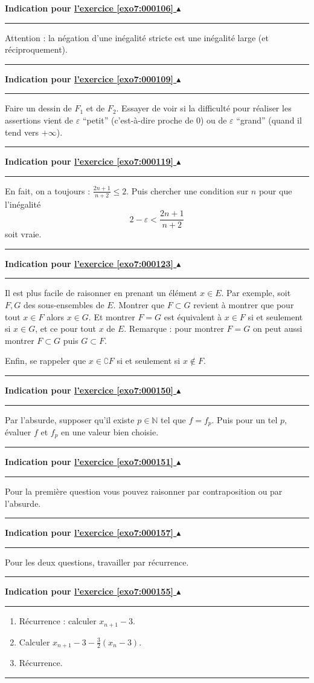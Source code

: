 \documentclass[11pt,a4paper]{article}
\newcommand{\Nn}{\mathbb{N}} \newcommand{\N}{\mathbb{N}}
\renewcommand{\epsilon}{\varepsilon}
\newcommand{\noindication}{}
\newcounter{exo}
\newcommand{\indication}[1]{\hypertarget{ind7:#1}{}\label{ind7:#1}{\bf Indication pour \hyperlink{exo7:#1}{l'exercice \ref{exo7:#1} $\blacktriangle$}}\vspace{1mm}\hrule\vspace{1mm}}
\newcommand{\finindication}{\vspace{1mm}\hrule\vspace*{7mm}}
\newcommand{\finindications}{\newpage}
\begin{document}
 \finindications 

\noindication
\indication{000106}
Attention : la n\'egation d'une in\'egalit\'e stricte est une in\'egalit\'e large
(et r\'eci\-pro\-quement).
\finindication
\indication{000109}
Faire un dessin de $F_1$ et de $F_2$.
Essayer de voir si la difficult\'e pour r\'ealiser les assertions vient de
$\epsilon$ ``petit'' (c'est-\`a-dire proche de $0$) ou de $\epsilon$ ``grand''
(quand il tend vers $+\infty$).
\finindication
\noindication
\noindication
\noindication
\noindication
\indication{000119}
En fait, on a toujours : $\frac{2n+1}{n+2} \leq 2$.
Puis chercher une condition sur $n$ pour que
l'in\'egalit\'e 
$$2-\epsilon < \frac{2n + 1}{n + 2}$$
soit vraie.
\finindication
\indication{000123}
Il est plus facile de raisonner en prenant un \'el\'ement $x\in E$.
Par exemple, soit $F, G$ des sous-ensembles de $E$. Montrer que $F\subset G$
revient à montrer que pour tout $x\in F$ alors $x\in G$.
Et montrer $F=G$ est \'equivalent \`a $x\in F$ si et seulement si $x\in G$,
et ce pour tout $x$ de $E$.
Remarque : pour montrer $F=G$ on peut aussi montrer $F\subset G$ puis $G\subset F$.

Enfin, se rappeler que $x\in \complement F$ si et seulement si $x\notin F$.
\finindication
\noindication
\noindication
\noindication
\indication{000150}
Par l'absurde, supposer qu'il existe $p\in \Nn$ tel que $f=f_p$.
Puis pour un tel $p$, \'evaluer $f$ et $f_p$ en une valeur bien choisie.
\finindication
\indication{000151}
Pour la premi\`ere question vous pouvez raisonner par contraposition ou par l'absurde.
\finindication
\noindication
\indication{000157}
Pour les deux questions, travailler par r\'ecurrence.
\finindication
\indication{000155}
\begin{enumerate}
    \item R\'ecurrence : calculer $x_{n+1}-3$.
    \item Calculer  $x_{n+1}-3 - \frac{3}{2}(x_n-3)$.
    \item R\'ecurrence.
\end{enumerate}
\finindication


\newpage
\end{document}
